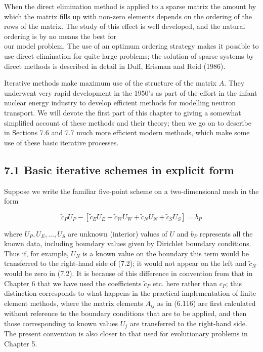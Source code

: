 \documentclass[10pt]{article}
\begin{document}
When the direct elimination method is applied to a sparse matrix the amount by which the matrix fills up with non-zero elements depends on the ordering of the rows of the matrix. The study of this effect is well developed, and the natural ordering is by no means the best for\\
our model problem. The use of an optimum ordering strategy makes it possible to use direct elimination for quite large problems; the solution of sparse systems by direct methods is described in detail in Duff, Erisman and Reid (1986).

Iterative methods make maximum use of the structure of the matrix \(A\). They underwent very rapid development in the 1950's as part of the effort in the infant nuclear energy industry to develop efficient methods for modelling neutron transport. We will devote the first part of this chapter to giving a somewhat simplified account of these methods and their theory; then we go on to describe in Sections 7.6 and 7.7 much more efficient modern methods, which make some use of these basic iterative processes.

\subsection*{7.1 Basic iterative schemes in explicit form}
Suppose we write the familiar five-point scheme on a two-dimensional mesh in the form

\[
\tilde{c}_{P} U_{P}-\left[\tilde{c}_{E} U_{E}+\tilde{c}_{W} U_{W}+\tilde{c}_{N} U_{N}+\tilde{c}_{S} U_{S}\right]=b_{P}
\]

where \(U_{P}, U_{E}, \ldots, U_{S}\) are unknown (interior) values of \(U\) and \(b_{P}\) represents all the known data, including boundary values given by Dirichlet boundary conditions. Thus if, for example, \(U_{N}\) is a known value on the boundary this term would be transferred to the right-hand side of (7.2); it would not appear on the left and \(\tilde{c}_{N}\) would be zero in (7.2). It is because of this difference in convention from that in Chapter 6 that we have used the coefficients \(\tilde{c}_{P}\) etc. here rather than \(c_{P}\); this distinction corresponds to what happens in the practical implementation of finite element methods, where the matrix elements \(A_{i j}\) as in (6.116) are first calculated without reference to the boundary conditions that are to be applied, and then those corresponding to known values \(U_{j}\) are transferred to the right-hand side. The present convention is also closer to that used for evolutionary problems in Chapter 5.
\end{document}

